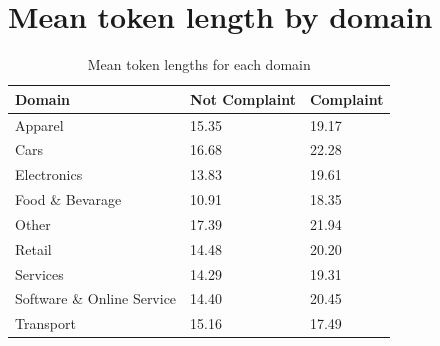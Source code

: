 \section{Mean token length by domain}
\label{sec: avg_token_length_domains}
\begin{table}[htbp]
    \small
    \centering
    \begin{tabularx}{\textwidth}{|X|X|X|}
        \hline
        \rowcolor[gray]{0.7}
        \textbf{Domain} & \textbf{Not Complaint} & \textbf{Complaint} \\
        \hline
        Apparel & 15.35 & 19.17 \\
        \hline
        Cars & 16.68 & 22.28 \\
        \hline
        Electronics & 13.83 & 19.61 \\
        \hline
        Food \& Bevarage & 10.91 & 18.35 \\
        \hline
        Other & 17.39 & 21.94 \\
        \hline
        Retail & 14.48 & 20.20 \\
        \hline
        Services & 14.29 & 19.31 \\
        \hline
        Software \& Online Service & 14.40 & 20.45 \\
        \hline
        Transport & 15.16 & 17.49 \\
        \hline
    \end{tabularx}
    \caption{Mean token lengths for each domain}
    \label{tab: avg_token_length_domains}    
\end{table}